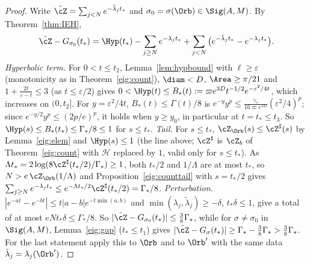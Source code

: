 \begin{proof}
Write $\tilde\cZ=\sum_{j<N}e^{-\tilde\lambda_jt_*}$ and $\sigma_0=\sigma(\Orb)\in\Sig(A,M)$. By Theorem~\ref{thm:IEH},
\[
  \tilde\cZ-G_{\sigma_0}(t_*)=\Hyp(t_*)-\sum_{j\ge N}e^{-\lambda_jt_*}+\sum_{j<N}\big(e^{-\tilde\lambda_jt_*}-e^{-\lambda_jt_*}\big).
\]
\emph{Hyperbolic term.} For $0<t\le t_2$, Lemma~\ref{lem:hypbound} with $\ell\ge\varepsilon$ (monotonicity as in Theorem~\ref{eig:count}), $\diam<D$, $\Area\ge\pi/21$ and $1+\frac{2t}{\varepsilon-t}\le3$ (as $t\le\varepsilon/2$) gives $0<\Hyp(t)\le B_*(t):=\varpi e^{3D}t^{-1/2}e^{-\varepsilon^2/4t}$, which increases on $(0,t_2]$. For $y=\varepsilon^2/4t$, $B_*(t)\le\Gamma(t)/8$ is $e^{-y}y^p\le\frac{\gamma_*}{16\varpi e^{3D}}(\varepsilon^2/4)^p$; since $e^{-y/2}y^p\le(2p/e)^p$, it holds when $y\ge y_0$, in particular at $t=t_*\le t_3$. So $\Hyp(s)\le B_*(t_*)\le\Gamma_*/8\le1$ for $s\le t_*$.
\emph{Tail.} For $s\le t_*$, $\cZ_\Orb(s)\le\cZ^\sharp(s)$ by Lemma~\ref{eig:elem} and $\Hyp(s)\le1$ (the line above; $\cZ^\sharp$ is $\cZ_b$ of Theorem~\ref{eig:count} with $\mathcal H$ replaced by $1$, valid only for $s\le t_*$). As $\Lambda t_*=2\log(8\cZ^\sharp(t_*/2)/\Gamma_*)\ge1$, both $t_*/2$ and $1/\Lambda$ are at most $t_*$, so $N>e\,\cZ_\Orb(1/\Lambda)$ and Proposition~\ref{eig:counttail} with $s=t_*/2$ gives $\sum_{j\ge N}e^{-\lambda_jt_*}\le e^{-\Lambda t_*/2}\cZ^\sharp(t_*/2)=\Gamma_*/8$.
\emph{Perturbation.} $|e^{-at}-e^{-bt}|\le t|a-b|e^{-t\min(a,b)}$ and $\min(\lambda_j,\tilde\lambda_j)\ge-\delta$, $t_*\delta\le1$, give a total of at most $eNt_*\delta\le\Gamma_*/8$.
So $|\tilde\cZ-G_{\sigma_0}(t_*)|\le\frac38\Gamma_*$, while for $\sigma\ne\sigma_0$ in $\Sig(A,M)$, Lemma~\ref{eig:gap} ($t_*\le t_1$) gives $|\tilde\cZ-G_\sigma(t_*)|\ge\Gamma_*-\frac38\Gamma_*>\frac38\Gamma_*$. For the last statement apply this to $\Orb$ and to $\Orb'$ with the same data $\tilde\lambda_j=\lambda_j(\Orb')$.
\end{proof}

